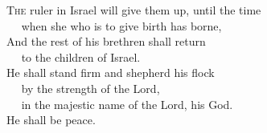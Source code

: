 
\lettrine{T}{he} ruler in Israel will give them up, until the time\\
   when she who is to give birth has borne,\\
And the rest of his brethren shall return\\
   to the children of Israel.\\
He shall stand firm and shepherd his flock\\
   by the strength of the Lord,\\
   in the majestic name of the Lord, his God.\\
He shall be peace.
